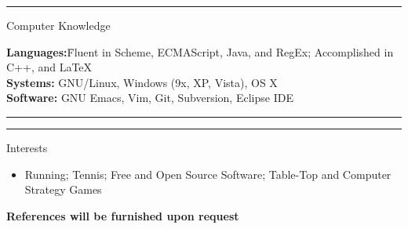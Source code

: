 \documentclass[10pt]{letter}
\begin{document}
\rule{\linewidth}{.5pt}

{\Large Computer Knowledge}
\begin{tabbing}
\textbf{Languages:}\hspace{.2in}\= Fluent in Scheme, ECMAScript,
                   Java, and RegEx; Accomplished in C++, and \LaTeX\\
\textbf{Systems:}\> GNU/Linux, Windows (9x, XP, Vista), OS X\\
\textbf{Software:}\> GNU Emacs, Vim, Git, Subversion, Eclipse IDE
\end{tabbing}\vspace{-15pt}

\rule{\linewidth}{.5pt}

\vspace{-15pt}

\rule{\linewidth}{.5pt}

{\Large Interests}\vspace{-5pt}
\begin{itemize}
\setlength\itemsep{1pt}
\item Running; Tennis; Free and Open Source Software; Table-Top and Computer Strategy Games
\end{itemize}
\begin{center}\textbf{References will be furnished upon request}\end{center}
\end{document}
